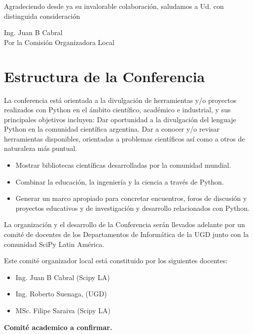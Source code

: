 \documentclass[11pt,a4paper]{report}
\begin{document}
        Agradeciendo desde ya su invalorable colaboración, saludamos a Ud.
        con distinguida consideración\\[0.5cm]



\begin{flushright}
Ing. Juan B Cabral\\
Por la Comisión Organizadora Local \\

\end{flushright}
\newpage
\section*{Estructura de la Conferencia}

    La conferencia está orientada a la divulgación de herramientas y/o
    proyectos realizados con Python en el ámbito científico, académico e
    industrial, y sus principales objetivos incluyen: Dar oportunidad a la
    divulgación del lenguaje Python en la comunidad científica argentina.
    Dar a conocer y/o revisar herramientas disponibles, orientadas a problemas
    científicos así como a otros de naturaleza más puntual.
  \begin{itemize}
    \item Mostrar bibliotecas científicas desarrolladas por la comunidad mundial.
    \item Combinar la educación, la ingeniería y la ciencia a través de Python.
    \item Generar un marco apropiado para concretar encuentros, foros de discusión y proyectos educativos y de investigación y desarrollo relacionados con Python.
  \end{itemize}
La organización y el desarrollo de la Conferencia serán llevados adelante
por un comité de docentes de los Departamentos de Informática de la UGD junto
con la comunidad SciPy Latin América.

Este comité organizador local está constituido por los siguientes docentes:\\
\begin{itemize}[nolistsep]
    \item Ing. Juan B Cabral (Scipy LA)
    \item Ing. Roberto Suenaga, (UGD)
    \item MSc. Filipe Saraiva (Scipy LA)
\end{itemize}

\textbf{Comité academico a confirmar.}
\end{document}
